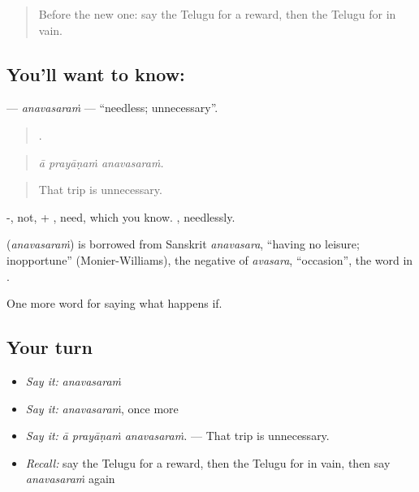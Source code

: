 \label{lesson:TE-C423-anavasaram}



\begin{quote}
Before the new one: say the Telugu for a reward, then the Telugu for in vain.
\end{quote}

\subsection*{You'll want to know: }
\textbf{} — \emph{anavasaraṁ} — \textquotedblleft{}needless; unnecessary\textquotedblright{}.

\begin{quote}
  .
\end{quote}

\begin{quote}
\emph{ā prayāṇaṁ anavasaraṁ.}
\end{quote}

\begin{quote}
That trip is unnecessary.
\end{quote}

-, not, + , need, which you know. , needlessly.

\begin{cousinweb}
\textbf{} (\emph{anavasaraṁ}) is borrowed from Sanskrit \emph{anavasara}, \textquotedblleft{}having no leisure; inopportune\textquotedblright{} (Monier-Williams), the negative of \emph{avasara}, \textquotedblleft{}occasion\textquotedblright{}, the word in .
\end{cousinweb}

\begin{grammarlens}[title={What you've built}]
One more word for saying what happens if.
\end{grammarlens}

\subsection*{Your turn}
\begin{itemize}
\raggedright
  \item \emph{Say it:} \emph{anavasaraṁ}
  \item \emph{Say it:} \emph{anavasaraṁ}, once more
  \item \emph{Say it:} \emph{ā prayāṇaṁ anavasaraṁ.} — That trip is unnecessary.
  \item \emph{Recall:} say the Telugu for a reward, then the Telugu for in vain, then say \emph{anavasaraṁ} again
\end{itemize}


